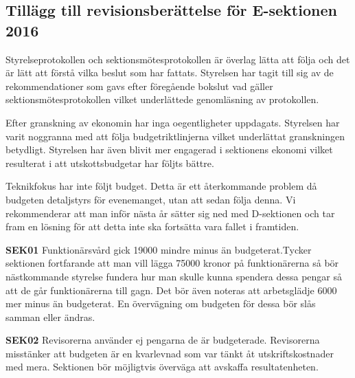 \documentclass[./vt16.tex]{subfiles}
\begin{document}
\subsection{Tillägg till revisionsberättelse för E-sektionen 2016}

Styrelseprotokollen och sektionsmötesprotokollen är överlag lätta att följa och det är lätt att förstå vilka beslut som har fattats. Styrelsen har tagit till sig av de rekommendationer som gavs efter föregående bokslut vad gäller sektionsmötesprotokollen vilket underlättede genomläsning av protokollen.

Efter granskning av ekonomin har inga oegentligheter uppdagats. Styrelsen har varit noggranna med att följa budgetriktlinjerna vilket underlättat granskningen betydligt. Styrelsen har även blivit mer engagerad i sektionens ekonomi vilket resulterat i att utskottsbudgetar har följts bättre.

Teknikfokus har inte följt budget. Detta är ett återkommande problem då budgeten detaljstyrs för
evenemanget, utan att sedan följa denna. Vi rekommenderar att man inför nästa år sätter sig ned
med D-sektionen och tar fram en lösning för att detta inte ska fortsätta vara fallet i framtiden.

\textbf{SEK01} Funktionärsvård gick 19000 mindre minus än budgeterat.Tycker sektionen
fortfarande att man vill lägga 75000 kronor på funktionärerna så bör nästkommande styrelse fundera hur man skulle kunna spendera dessa pengar så att de går funktionärerna till gagn. Det bör även noteras att arbetsglädje 6000 mer minus än budgeterat. En övervägning om budgeten för dessa bör slås samman eller ändras.

\textbf{SEK02} Revisorerna använder ej pengarna de är budgeterade. Revisorerna misstänker att budgeten är en kvarlevnad som var tänkt åt utskriftskostnader med mera. Sektionen bör möjligtvis överväga att avskaffa resultatenheten.
\end{document}
